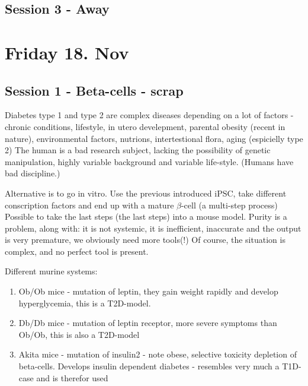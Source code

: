 \documentclass[12p]{article}
\begin{document}
\subsection*{Session 3 - Away}
\section*{Friday 18. Nov}

\subsection*{Session 1 - Beta-cells - scrap}

Diabetes type 1 and type 2 are complex diseases depending on a lot of factors - chronic conditions, lifestyle, in utero develepment, parental obesity (recent in nature), environmental factors, nutrions, intertestional flora, aging (espicielly type 2)
The human is a bad research subject, lacking the possibility of genetic manipulation, highly variable background and variable life-style.
(Humans have bad discipline.)

Alternative is to go in vitro.
Use the previous introduced  iPSC, take different conscription factors and end up with a mature $\beta$-cell (a multi-step process)
Possible to take the last steps (the last steps) into a mouse model.
Purity is a problem, along with: it is not systemic, it is inefficient, inaccurate and the output is very premature, we obviously need more tools(!)
Of course, the situation is complex, and no perfect tool is present.

Different murine systems:

\begin{enumerate}
    \item
	Ob/Ob mice - mutation of leptin, they gain weight rapidly and develop hyperglycemia, this is a T2D-model.
    \item
	Db/Db mice - mutation of leptin receptor, more severe symptoms than Ob/Ob, this is also a T2D-model
    \item
	Akita mice - mutation of insulin2 - note obese, selective toxicity depletion of beta-cells. Develops insulin dependent diabetes - resembles very much a T1D-case and is therefor used 
\end{enumerate}
\end{document}
